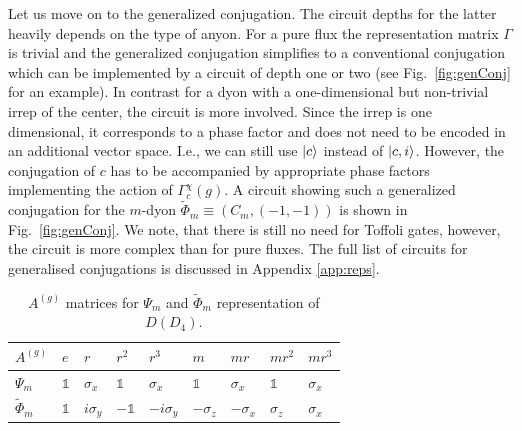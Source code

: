 \documentclass[two column]{article}
\begin{document}
Let us move on to the generalized conjugation. The circuit depths for the latter heavily depends on the type of anyon. For a pure flux the representation matrix $\Gamma$ is trivial and the generalized conjugation simplifies to a conventional conjugation which can be implemented by a circuit of depth one or two (see Fig.~\ref{fig:genConj} for an example). In contrast for a dyon with a one-dimensional but non-trivial irrep of the center, the circuit is more involved. Since the irrep is one dimensional, it corresponds to a phase factor and does not need to be encoded in an additional vector space. I.e., we can still use $\ket{c}$ instead of $\ket{c,i}$. However, the conjugation of $c$ has to be accompanied by appropriate phase factors implementing the action of $\Gamma^\chi_c(g)$. A circuit showing such a generalized conjugation for the $m$-dyon $\tilde{\Phi}_m \equiv (C_m, (-1, -1))$ is shown in Fig.~\ref{fig:genConj}. We note, that there is still no need for Toffoli gates, however, the circuit is more complex than for pure fluxes. The full list of circuits for generalised conjugations is discussed in Appendix \ref{app:reps}.

\begin{table}[]
    \centering
    \begin{tabular}{|p{0.5cm}||p{0.25cm}|p{0.5cm}|p{0.5cm}|p{0.6cm}|p{0.5cm}|p{0.5cm}|p{0.5cm}|p{0.5cm}|}
    \hline
  $A^{(g)}$ & $e$ &   $r$ & $r^2$ & $r^3$ &  $m$ & $mr$ & $mr^2$ & $mr^3$ \\
\hline\hline
 $\Psi_{m}$ &$\mathbb{1}$&  $\sigma_x$ & $\mathbb{1}$&  $\sigma_x$ & $\mathbb{1}$& $\sigma_x$ &  $\mathbb{1}$&   $\sigma_x$ \\\hline
 $\tilde{\Phi}_{m}$ &$\mathbb{1}$&$i\sigma_y$ &$-\mathbb{1}$& $-i\sigma_y$ &$-\sigma_z$ &$-\sigma_x$ &  $\sigma_z$ &   $\sigma_x$ \\\hline
\end{tabular}
    \caption{$A^{(g)}$ matrices for $\Psi_m$ and $\tilde{\Phi}_m$ representation of $D(D_4)$.}
    \label{tab:somereps}
\end{table}
\end{document}

